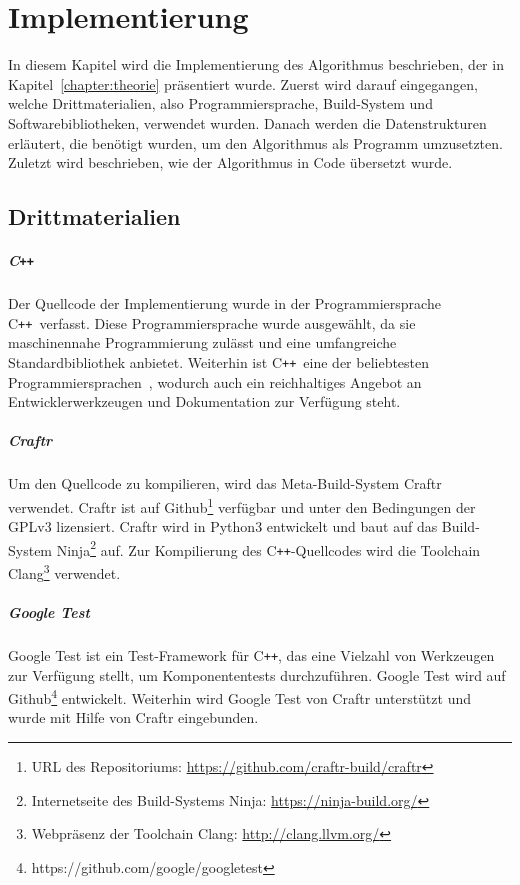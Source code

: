 \newcommand{\Cpp}{C{}\texttt{++}}

\chapter{Implementierung}\label{chapter:implementierung}
In diesem Kapitel wird die Implementierung des Algorithmus beschrieben, der in Kapitel~\ref{chapter:theorie} präsentiert wurde.
Zuerst wird darauf eingegangen, welche Drittmaterialien, also Programmiersprache, Build-System und Softwarebibliotheken, verwendet wurden.
Danach werden die Datenstrukturen erläutert, die benötigt wurden, um den Algorithmus als Programm umzusetzten.
Zuletzt wird beschrieben, wie der Algorithmus in Code übersetzt wurde.

\section{Drittmaterialien}
\paragraph{\Cpp}
Der Quellcode der Implementierung wurde in der Programmiersprache \Cpp\ verfasst.
Diese Programmiersprache wurde ausgewählt, da sie maschinennahe Programmierung zulässt und eine umfangreiche Standardbibliothek anbietet.
Weiterhin ist \Cpp\ eine der beliebtesten Programmiersprachen~\parencite{TIO17}, wodurch auch ein reichhaltiges Angebot an Entwicklerwerkzeugen und Dokumentation zur Verfügung steht.

\paragraph{Craftr}
Um den Quellcode zu kompilieren, wird das Meta-Build-System Craftr verwendet.
Craftr ist auf Github\footnote{URL des Repositoriums: \url{https://github.com/craftr-build/craftr}} verfügbar und unter den Bedingungen der GPLv3 lizensiert.
Craftr wird in Python3 entwickelt und baut auf das Build-System Ninja\footnote{Internetseite des Build-Systems Ninja: \url{https://ninja-build.org/}} auf. 
Zur Kompilierung des \Cpp\hyp Quellcodes wird die Toolchain Clang\footnote{Webpräsenz der Toolchain Clang: \url{http://clang.llvm.org/}} verwendet.

\paragraph{Google Test}
Google Test ist ein Test-Framework für \Cpp, das eine Vielzahl von Werkzeugen zur Verfügung stellt, um Komponententests durchzuführen. 
Google Test wird auf Github\footnote{https://github.com/google/googletest} entwickelt.
Weiterhin wird Google Test von Craftr unterstützt und wurde mit Hilfe von Craftr eingebunden.

